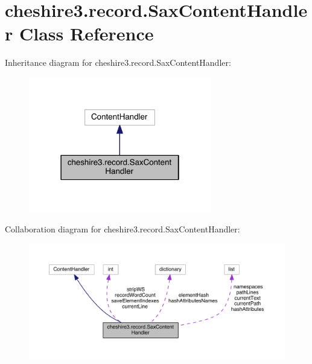 \hypertarget{classcheshire3_1_1record_1_1_sax_content_handler}{\section{cheshire3.\-record.\-Sax\-Content\-Handler Class Reference}
\label{classcheshire3_1_1record_1_1_sax_content_handler}
}


Inheritance diagram for cheshire3.\-record.\-Sax\-Content\-Handler\-:
\nopagebreak
\begin{figure}[H]
\begin{center}
\leavevmode
\includegraphics[width=226pt]{classcheshire3_1_1record_1_1_sax_content_handler__inherit__graph}
\end{center}
\end{figure}


Collaboration diagram for cheshire3.\-record.\-Sax\-Content\-Handler\-:
\nopagebreak
\begin{figure}[H]
\begin{center}
\leavevmode
\includegraphics[width=350pt]{classcheshire3_1_1record_1_1_sax_content_handler__coll__graph}
\end{center}
\end{figure}
